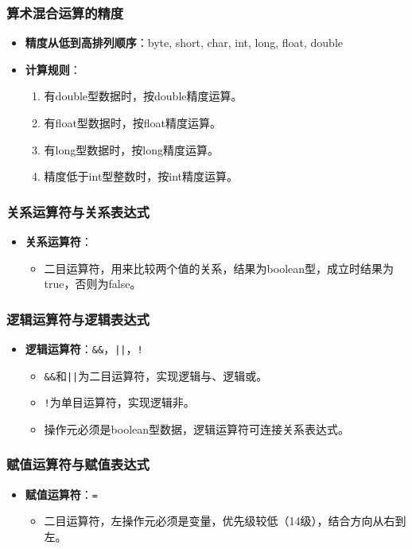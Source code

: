 \documentclass[a4paper, 10pt]{ctexart}
\begin{document}
\subsubsection{算术混合运算的精度}
\begin{itemize}
  \item \textbf{精度从低到高排列顺序}：byte, short, char, int, long, float, double
  \item \textbf{计算规则}：
  \begin{enumerate}
    \item 有double型数据时，按double精度运算。
    \item 有float型数据时，按float精度运算。
    \item 有long型数据时，按long精度运算。
    \item 精度低于int型整数时，按int精度运算。
  \end{enumerate}
\end{itemize}

\subsubsection{关系运算符与关系表达式}
\begin{itemize}
  \item \textbf{关系运算符}：
  \begin{itemize}
    \item 二目运算符，用来比较两个值的关系，结果为boolean型，成立时结果为true，否则为false。
  \end{itemize}
\end{itemize}

\subsubsection{逻辑运算符与逻辑表达式}
\begin{itemize}
  \item \textbf{逻辑运算符}：\texttt{\&\&}，\texttt{||}，\texttt{!}
  \begin{itemize}
    \item \texttt{\&\&}和\texttt{||}为二目运算符，实现逻辑与、逻辑或。
    \item \texttt{!}为单目运算符，实现逻辑非。
    \item 操作元必须是boolean型数据，逻辑运算符可连接关系表达式。
  \end{itemize}
\end{itemize}

\subsubsection{赋值运算符与赋值表达式}
\begin{itemize}
  \item \textbf{赋值运算符}：\texttt{=}
  \begin{itemize}
    \item 二目运算符，左操作元必须是变量，优先级较低（14级），结合方向从右到左。
  \end{itemize}
\end{itemize}
\end{document}
